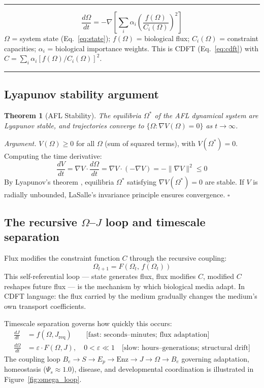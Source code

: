 \documentclass[11pt]{article}
\newcommand{\Jreq}{J_{\mathrm{req}}}
\newcommand{\Om}{\Omega}
\newtheorem{theorem}{Theorem}
\newenvironment{masterbox}{\begin{center}\begin{minipage}{0.95\linewidth}\hrule\vspace{0.5em}}{\vspace{0.5em}\hrule\end{minipage}\end{center}}
\begin{document}
\begin{masterbox}
\begin{equation}
\frac{d\Om}{dt} = -\nabla\!\left[\sum_i \alpha_i \left(\frac{f(\Om)}{C_i(\Om)}\right)^{\!2}\right]
\label{eq:master}
\end{equation}
{\small $\Om$ = system state (Eq.~\ref{eq:state}); $f(\Om)$ = biological flux;
$C_i(\Om)$ = constraint capacities; $\alpha_i$ = biological importance weights.
This is CDFT (Eq.~\ref{eq:cdft}) with $C = \sum_i\alpha_i[f(\Om)/C_i(\Om)]^2$.}
\end{masterbox}

\subsection{Lyapunov stability argument}

\begin{theorem}[AFL Stability]
The equilibria $\Om^*$ of the AFL dynamical system are Lyapunov stable, and trajectories converge to $\{\Om : \nabla V(\Om) = 0\}$ as $t \to \infty$.
\end{theorem}
\noindent\textit{Argument.}
$V(\Om) \geq 0$ for all $\Om$ (sum of squared terms), with $V(\Om^*) = 0$. Computing the time derivative:
\begin{equation}
\frac{dV}{dt} = \nabla V \cdot \frac{d\Om}{dt} = \nabla V \cdot (-\nabla V) = -\|\nabla V\|^2 \leq 0
\label{eq:lyapunov}
\end{equation}
By Lyapunov's theorem \citep{lyapunov1992}, equilibria $\Om^*$ satisfying $\nabla V(\Om^*) = 0$ are stable. If $V$ is radially unbounded, LaSalle's invariance principle ensures convergence. $\square$

\subsection{The recursive $\Om$--$J$ loop and timescale separation}
\label{sec:bidir}

Flux modifies the constraint function $C$ through the recursive coupling:
\begin{equation}
\Om_{t+1} = F\!\left(\Om_t,\, f(\Om_t)\right)
\label{eq:recursive}
\end{equation}
This self-referential loop --- state generates flux, flux modifies $C$, modified $C$ reshapes future flux --- is the mechanism by which biological media adapt. In CDFT language: the flux carried by the medium gradually changes the medium's own transport coefficients.

Timescale separation governs how quickly this occurs:
\begin{align}
\frac{dJ}{dt} &= f(\Om, \Jreq) \qquad \text{[fast: seconds--minutes; flux adaptation]} \label{eq:fast}\\
\frac{d\Om}{dt} &= \varepsilon \cdot F(\Om, J),\quad 0 < \varepsilon \ll 1 \quad \text{[slow: hours--generations; structural drift]} \label{eq:slow}
\end{align}
The coupling loop $B_e \to S \to E_p \to \mathrm{Enz} \to J \to \Om \to B_e$ governing adaptation, homeostasis ($\Psi_s \approx 1.0$), disease, and developmental coordination is illustrated in Figure~\ref{fig:omega_loop}.
\end{document}
